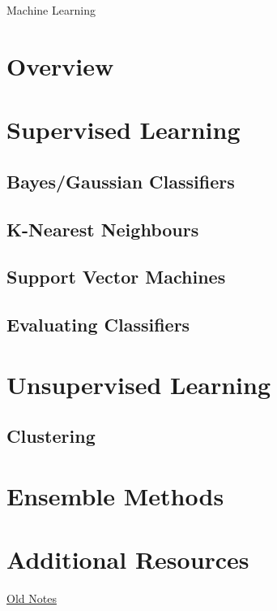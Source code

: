Machine Learning
\section{Overview}
\section{Supervised Learning}
\subsection{Bayes/Gaussian Classifiers}
\subsection{K-Nearest Neighbours}
\subsection{Support Vector Machines}
\subsection{Evaluating Classifiers}
\section{Unsupervised Learning}
\subsection{Clustering}
\section{Ensemble Methods}
\section{Additional Resources}
\href{http://www.cs.bham.ac.uk/~axk/ML_new.htm}{Old Notes}